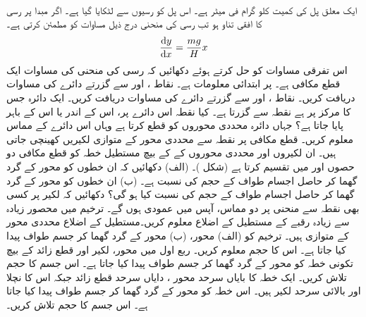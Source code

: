 \\
ایک معلق پل کی کمیت  کلو گرام فی میٹر ہے۔ اس پل کو رسیوں سے لٹکایا گیا ہے۔ اگر مبدا پر رسی کا افقی تناو  ہو تب رسی کی منحنی درج ذیل مساوات کو مطمئن کرتی ہے۔
\begin{align*}
\frac{\dif y}{\dif x}=\frac{mg}{H}x
\end{align*}
اس تفرقی مساوات کو حل کرتے ہوئے دکھائیں کہ رسی کی منحنی کی مساوات ایک قطع مکافی ہے۔  پر  ابتدائی معلومات ہے۔
نقاط ،  اور  سے گزرتے دائرے کی مساوات دریافت کریں۔
نقاط ،  اور  سے گزرتے دائرے کی مساوات دریافت کریں۔
ایک دائرہ جس کا مرکز  پر ہے نقطہ  سے گزرتا ہے۔  کیا نقطہ  اس دائرے پر، اس کے اندر یا اس کے باہر پایا جاتا ہے؟
جہاں دائرہ  محددی محوروں کو قطع کرتا ہے وہاں اس دائرے کے مماس معلوم کریں۔ 
قطع مکافی  پر نقطہ  سے محددی محور کے متوازی لکیریں کھینچی جاتی ہیں۔ ان لکیروں اور محددی محوروں کے کے بیچ مستطیل خطہ کو قطع مکافی دو حصوں  اور  میں تقسیم کرتا ہے (شکل )۔ (الف) دکھائیں کہ ان خطوں کو  محور کے گرد گھما کر حاصل اجسام طواف کے حجم کی نسبت  ہے۔ (ب) ان خطوں کو  محور کے گرد گھما کر حاصل اجسام طواف کے حجم کی نسبت کیا ہو گی؟ 
دکھائیں کہ لکیر  پر  کسی بھی نقطہ سے منحنی  پر دو مماس، آپس میں عمودی ہوں گے۔  
ترخیم  میں محصور زیادہ سے زیادہ رقبے کے مستطیل کے اضلاع معلوم کریں۔مستطیل کے اضلاع محددی محور کے متوازی ہیں۔ 
ترخیم  کو (الف)  محور، (ب)  محور کے گرد گھما کر جسم طواف پیدا کیا جاتا ہے۔ اس کا حجم معلوم کریں۔
ربع اول میں  محور، لکیر  اور قطع زائد  کے بیچ تکونی خطہ کو  محور کے گرد گھما کر جسم طواف پیدا کیا جاتا ہے۔  اس جسم کا حجم تلاش کریں۔
ایک خطہ کا بایاں سرحد محور ، دایاں سرحد قطع زائد   جبکہ اس کا نچلا اور بالائی سرحد لکیر  ہیں۔ اس خطہ کو  محور کے گرد گھما کر جسم طواف پیدا کیا جاتا ہے۔ اس جسم کا حجم تلاش کریں۔ 
